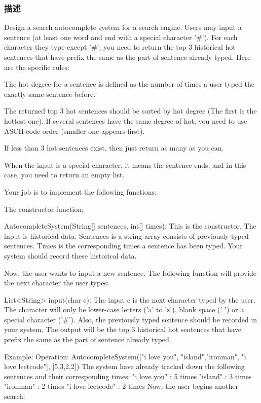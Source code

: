 \subsubsection{描述}
Design a search autocomplete system for a search engine. Users may input a sentence (at least one word and end with a special character '\#'). For each character they type except '\#', you need to return the top 3 historical hot sentences that have prefix the same as the part of sentence already typed. Here are the specific rules:

\begindot
\item The hot degree for a sentence is defined as the number of times a user typed the exactly same sentence before.
\item The returned top 3 hot sentences should be sorted by hot degree (The first is the hottest one). If several sentences have the same degree of hot, you need to use ASCII-code order (smaller one appears first).
\item If less than 3 hot sentences exist, then just return as many as you can.
\item When the input is a special character, it means the sentence ends, and in this case, you need to return an empty list.
\myenddot

Your job is to implement the following functions:

The constructor function:

AutocompleteSystem(String[] sentences, int[] times): This is the constructor. The input is historical data. Sentences is a string array consists of previously typed sentences. Times is the corresponding times a sentence has been typed. Your system should record these historical data.

Now, the user wants to input a new sentence. The following function will provide the next character the user types:

List<String> input(char c): The input c is the next character typed by the user. The character will only be lower-case letters ('a' to 'z'), blank space (' ') or a special character ('\#'). Also, the previously typed sentence should be recorded in your system. The output will be the top 3 historical hot sentences that have prefix the same as the part of sentence already typed.

Example:
Operation: AutocompleteSystem(["i love you", "island","ironman", "i love leetcode"], [5,3,2,2])
The system have already tracked down the following sentences and their corresponding times:
"i love you" : 5 times
"island" : 3 times
"ironman" : 2 times
"i love leetcode" : 2 times
Now, the user begins another search:


